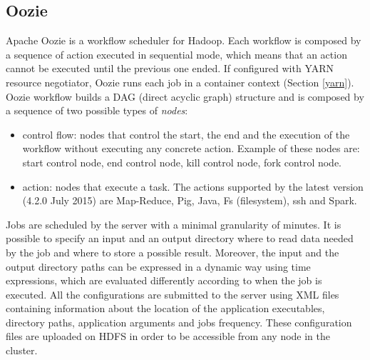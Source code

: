 \subsection{Oozie}
Apache Oozie\cite{bib20} is a workflow scheduler for Hadoop. Each workflow is composed by a sequence of action executed in sequential mode, which means that an action cannot be executed until the previous one ended. If configured with YARN resource negotiator, Oozie runs each job in a container context (Section \ref{yarn}).
Oozie workflow builds a DAG (direct acyclic graph) structure and is composed by a sequence of two possible types of \textit{nodes}:
\begin{itemize}
\item control flow: nodes that control the start, the end and the execution of the workflow without executing any concrete action. Example of these nodes are: start control node, end control node, kill control node, fork control node.
\item action: nodes that execute a task. The actions supported by the latest version (4.2.0 July 2015) are Map-Reduce, Pig, Java, Fs (filesystem), ssh and Spark.	 
\end{itemize}
Jobs are scheduled by the server with a minimal granularity of minutes. It is possible to specify an input and an output directory where to read data needed by the job and where to store a possible result. Moreover, the input and the output directory paths can be expressed in a dynamic way using time expressions, which are evaluated differently according to when the job is executed. All the configurations are submitted to the server using XML files containing information about the location of the application executables, directory paths, application arguments and jobs frequency. These configuration files are uploaded on HDFS in order to be accessible from any node in the cluster.

